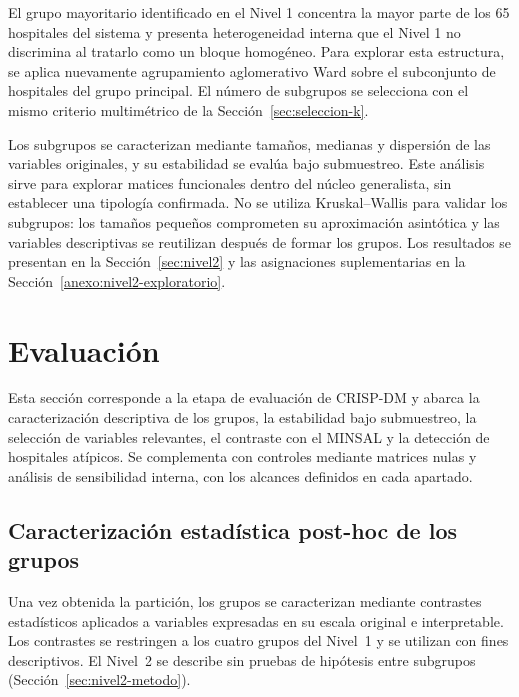 El grupo mayoritario identificado en el Nivel 1 concentra la mayor parte de los
65 hospitales del sistema y presenta heterogeneidad interna que el Nivel 1 no
discrimina al tratarlo como un bloque homogéneo. Para explorar esta estructura,
se aplica nuevamente agrupamiento aglomerativo Ward sobre el subconjunto de
hospitales del grupo principal. El número de subgrupos se selecciona con el
mismo criterio multimétrico de la Sección~\ref{sec:seleccion-k}.

Los subgrupos se caracterizan mediante tamaños, medianas y dispersión de las
variables originales, y su estabilidad se evalúa bajo submuestreo. Este análisis
sirve para explorar matices funcionales dentro del núcleo generalista, sin
establecer una tipología confirmada. No se utiliza Kruskal--Wallis para validar
los subgrupos: los tamaños pequeños comprometen su aproximación asintótica y
las variables descriptivas se reutilizan después de formar los grupos. Los
resultados se presentan en la Sección~\ref{sec:nivel2} y las asignaciones
suplementarias en la Sección~\ref{anexo:nivel2-exploratorio}.

\section{Evaluación}
\label{sec:evaluacion}

Esta sección corresponde a la etapa de evaluación de CRISP-DM y abarca la
caracterización descriptiva de los grupos, la estabilidad bajo submuestreo,
la selección de variables relevantes, el contraste con el MINSAL y la detección
de hospitales atípicos. Se complementa con controles mediante matrices nulas
y análisis de sensibilidad interna, con los alcances definidos en cada apartado.


\subsection{Caracterización estadística post-hoc de los grupos}
\label{sec:validacion-grupos}

Una vez obtenida la partición, los grupos se caracterizan mediante contrastes
estadísticos aplicados a variables expresadas en su escala original e
interpretable. Los contrastes se restringen a los cuatro grupos del Nivel~1 y se utilizan
con fines descriptivos. El Nivel~2 se describe sin pruebas de hipótesis entre
subgrupos (Sección~\ref{sec:nivel2-metodo}).

